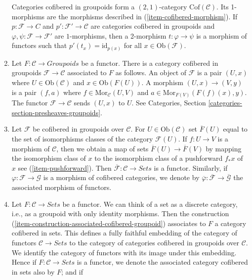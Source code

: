 \begin{remarks}
\begin{enumerate}
Categories cofibered in groupoids form a $(2, 1)$-category 
$\text{Cof}(\mathcal{C})$. Its 1-morphisms are the morphisms described in 
(\ref{item-cofibered-morphism}). If $p: \mathcal{F} \to C$ and 
$p': \mathcal{F}' \to \mathcal{C}$ are categories cofibered in groupoids 
and $\varphi, \psi: \mathcal{F} \to \mathcal{F}'$ are $1$-morphisms, then 
a 2-morphism $t: \varphi \to \psi$ is a morphism of functors such that 
$p'(t_x) = \text{id}_{p(x)}$ for all $x \in \text{Ob}(\mathcal{F})$.
\item
\label{item-construction-associated-cofibered-groupoid} 
Let $F : \mathcal{C} \to \textit{Groupoids}$ be a functor. There 
is a category cofibered in groupoids $\mathcal{F} \to \mathcal{C}$ 
associated to $F$ as follows. An object of $\mathcal{F}$ is a pair $(U, x)$ 
where $U \in \text{Ob}(\mathcal{C})$ and $x \in \text{Ob}(F(U))$. A 
morphism $(U,x) \to (V,y)$ is a pair $(f, a)$ where
$f \in \text{Mor}_{\mathcal{C}}(U,V)$ and
$a \in \text{Mor}_{F(V)}(F(f)(x),y)$.
The functor $\mathcal{F} \to \mathcal{C}$ sends $(U, x)$ to $U$. See
Categories, Section \ref{categories-section-presheaves-groupoids}.
\item Let $\mathcal{F}$ be cofibered in groupoids over $\mathcal{C}$.
For $U \in \text{Ob}(\mathcal{C})$ set $\overline{F}(U)$ equal to
the set of isomorphisms classes of the category $\mathcal{F}(U)$.
If $f : U \to V$ is a morphism of $\mathcal{C}$, then we obtain a
map of sets $\overline{F}(U) \to \overline{F}(V)$ by mapping the
isomorphism class of $x$ to the isomorphism class of a pushforward
$f_*x$ of $x$ see (\ref{item-pushforward}). Then
$\overline{\mathcal{F}} : \mathcal{C} \to \textit{Sets}$ is a
functor. Similarly, if $\varphi: \mathcal{F} \to \mathcal{G}$ is a
morphism of cofibered categories, we denote by
$\overline{\varphi}: \overline{\mathcal{F}} \to  \overline{\mathcal{G}}$
the associated morphism of functors.
\item 
\label{item-convention-cofibered-sets}
Let $F: \mathcal{C} \to \textit{Sets}$ be a functor. We can think of a
set as a discrete category, i.e., as a groupoid with only identity morphisms.
Then the construction (\ref{item-construction-associated-cofibered-groupoid})
associates to $F$ a category cofibered in sets. This defines a fully
faithful embedding of the category of functors $\mathcal{C} \to \textit{Sets}$
to the category of categories cofibered in groupoids over $\mathcal{C}$.
We identify the category of functors with its image under this embedding.
Hence if $F : \mathcal{C} \to \textit{Sets}$ is a functor, we denote the 
associated category cofibered in sets also by $F$; and if

\end{enumerate}
\end{remarks}
